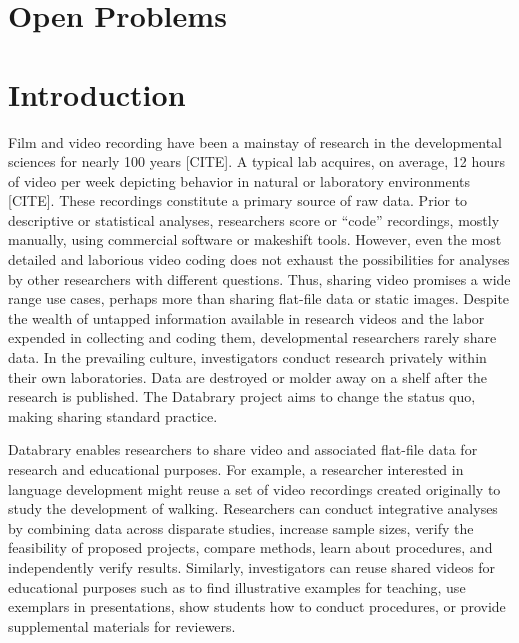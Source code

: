 \documentclass{sig-alternate}
\begin{document}
\section{Open Problems}



\section{Introduction}

Film and video recording have been a mainstay of research in the
developmental sciences for nearly 100 years [CITE]. A typical lab
acquires, on average, 12 hours of video per week depicting behavior in
natural or laboratory environments [CITE]. These recordings constitute a
primary source of raw data. Prior to descriptive or statistical
analyses, researchers score or “code” recordings, mostly manually, using
commercial software or makeshift tools. However, even the most detailed
and laborious video coding does not exhaust the possibilities for
analyses by other researchers with different questions. Thus, sharing
video promises a wide range use cases, perhaps more than sharing
flat-file data or static images. Despite the wealth of untapped
information available in research videos and the labor expended in
collecting and coding them, developmental researchers rarely share data.
In the prevailing culture, investigators conduct research privately
within their own laboratories. Data are destroyed or molder away on a
shelf after the research is published. The Databrary project aims to
change the status quo, making sharing standard practice.

Databrary enables researchers to share video and associated flat-file
data for research and educational purposes. For example, a researcher
interested in language development might reuse a set of video recordings
created originally to study the development of walking. Researchers can
conduct integrative analyses by combining data across disparate studies,
increase sample sizes, verify the feasibility of proposed projects,
compare methods, learn about procedures, and independently verify
results. Similarly, investigators can reuse shared videos for
educational purposes such as to find illustrative examples for teaching,
use exemplars in presentations, show students how to conduct procedures,
or provide supplemental materials for reviewers.
\end{document}
